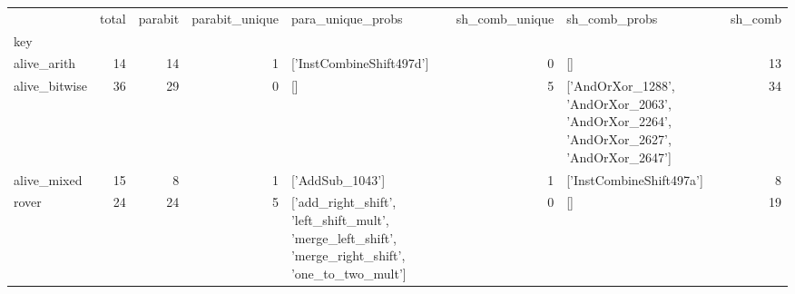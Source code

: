 \begin{tabular}{lrrrlrlr}
\toprule
 & total & parabit & parabit_unique & para_unique_probs & sh_comb_unique & sh_comb_probs & sh_comb \\
key &  &  &  &  &  &  &  \\
\midrule
alive_arith & 14 & 14 & 1 & ['InstCombineShift497d'] & 0 & [] & 13 \\
alive_bitwise & 36 & 29 & 0 & [] & 5 & ['AndOrXor_1288', 'AndOrXor_2063', 'AndOrXor_2264', 'AndOrXor_2627', 'AndOrXor_2647'] & 34 \\
alive_mixed & 15 & 8 & 1 & ['AddSub_1043'] & 1 & ['InstCombineShift497a'] & 8 \\
rover & 24 & 24 & 5 & ['add_right_shift', 'left_shift_mult', 'merge_left_shift', 'merge_right_shift', 'one_to_two_mult'] & 0 & [] & 19 \\
\bottomrule
\end{tabular}
